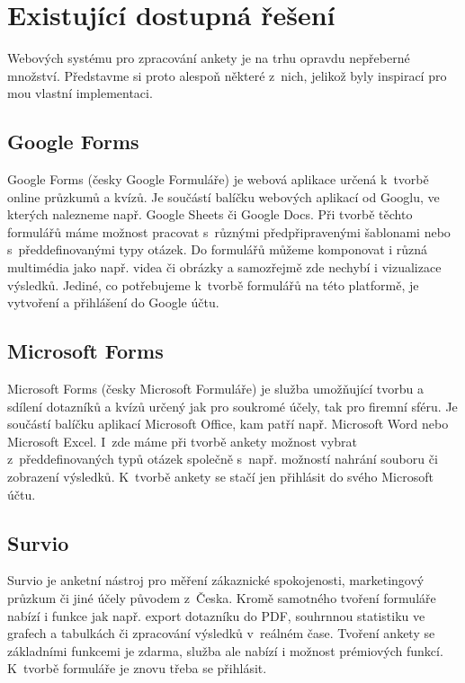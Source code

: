 \chapter{Existující dostupná řešení}

Webových systému pro zpracování ankety je na trhu opravdu nepřeberné množství. Představme si proto alespoň některé z~nich, jelikož byly inspirací pro mou vlastní implementaci.

\section{Google Forms}

Google Forms (česky Google Formuláře) je webová aplikace určená k~tvorbě online průzkumů a kvízů. Je součástí balíčku webových aplikací od Googlu, ve kterých nalezneme např. Google Sheets či Google Docs. Při tvorbě těchto formulářů máme možnost pracovat s~různými předpřipravenými šablonami nebo s~předdefinovanými typy otázek. Do formulářů můžeme komponovat i různá multimédia jako např. videa či obrázky a samozřejmě zde nechybí i vizualizace výsledků. Jediné, co potřebujeme k~tvorbě formulářů na této platformě, je vytvoření a přihlášení do Google účtu. \cite{GoogleForms1}\cite{GoogleForms2}

\section{Microsoft Forms}
Microsoft Forms (česky Microsoft Formuláře) je služba umožňující tvorbu a sdílení dotazníků a kvízů určený jak pro soukromé účely, tak pro firemní sféru. Je součástí balíčku aplikací Microsoft Office, kam patří např. Microsoft Word nebo Microsoft Excel. I~zde máme při tvorbě ankety možnost vybrat z~předdefinovaných typů otázek společně s~např. možností nahrání souboru či zobrazení výsledků. K~tvorbě ankety se stačí jen přihlásit do svého Microsoft účtu. \cite{MSForms1}\cite{MSForms2}

\section{Survio}
Survio je anketní nástroj pro měření zákaznické spokojenosti, marketingový průzkum či jiné účely původem z~Česka. Kromě samotného tvoření formuláře nabízí i funkce jak např. export dotazníku do PDF, souhrnnou statistiku ve grafech a tabulkách či zpracování výsledků v~reálném čase. Tvoření ankety se základními funkcemi je zdarma, služba ale nabízí i možnost prémiových funkcí. K~tvorbě formuláře je znovu třeba se přihlásit. \cite{Survio}

